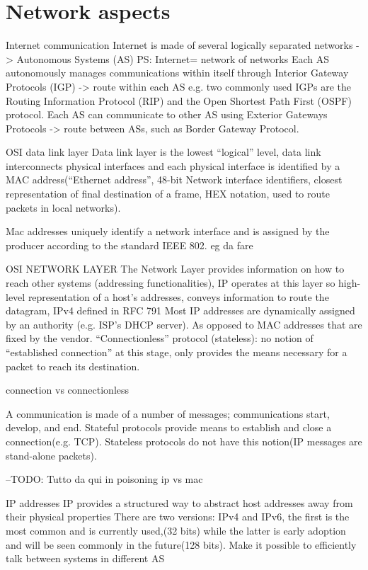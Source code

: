 \chapter{Network aspects}
Internet communication 
Internet is made of several logically separated networks -> Autonomous Systems (AS)
PS: Internet= network of networks
Each AS autonomously manages communications within itself through Interior Gateway Protocols (IGP) -> route within each AS
e.g. two commonly used IGPs are the Routing Information Protocol (RIP) and the Open Shortest Path First (OSPF) protocol.
Each AS can communicate to other AS using Exterior Gateways Protocols -> route between ASs, such as Border Gateway Protocol.


OSI data link layer
Data link layer is the lowest “logical” level, data link interconnects physical interfaces and each physical interface is identified by a MAC address(“Ethernet address”, 48-bit Network interface identifiers, closest representation of final destination of a frame, HEX notation, used to route packets in local networks).



Mac addresses uniquely identify a network interface and is assigned by the producer according to the standard IEEE 802. 
eg da fare 

OSI NETWORK LAYER
The Network Layer provides information on how to reach other systems (addressing functionalities), IP operates at this layer so high-level representation of a host’s addresses, conveys information to route the datagram, IPv4 defined in RFC 791
Most IP addresses are dynamically assigned by an authority (e.g. ISP’s DHCP server). As opposed to MAC addresses that are fixed by the vendor. “Connectionless” protocol (stateless): no notion of “established connection” at this stage, only provides the means necessary for a packet to reach its destination.

connection vs connectionless

A communication is made of a number of messages; communications start, develop, and end. Stateful protocols provide means to establish and close a connection(e.g. TCP).
Stateless protocols do not have this notion(IP messages are stand-alone packets).

--TODO: Tutto da qui in poisoning
ip vs mac

IP addresses
IP provides a structured way to abstract host addresses away from their physical properties
There are two versions: IPv4 and IPv6, the first is the most common and is currently used,(32 bits) while the latter is early adoption and will be seen commonly in the future(128 bits).
Make it possible to efficiently talk between systems in different AS

